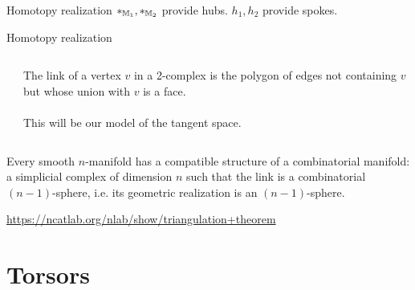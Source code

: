 \documentclass[14pt,aspectratio=169]{beamer}
\renewcommand{\defemph}[1]{\alert{#1}}
\begin{document}

\begin{frame}{Homotopy realization}
\( *_{\mathbb{M}_1}, *_{\mathbb{M}_2} \) provide \alert{hubs}. \( h_1, h_2 \) provide \alert{spokes}.
\[\]
\end{frame}


\begin{frame}{Homotopy realization}
\begin{columns}
\begin{column}{0.5\textwidth}

\end{column}
\begin{column}{0.5\textwidth}
The \defemph{link} of a vertex \( v \) in a 2-complex is the polygon of edges not containing \( v \) but whose union with \( v \) is a face.\\~\\

This will be our model of the tangent space.
\end{column}
\end{columns}
\end{frame}

\begin{frame}
\begin{theorem}[Whitehead (1940)]
Every smooth \( n \)-manifold has a compatible structure of a \alert{combinatorial manifold}: a simplicial complex of dimension \( n \) such that the link is a combinatorial \( (n-1) \)-sphere, i.e. its geometric realization is an \( (n-1) \)-sphere.
\end{theorem}
\url{https://ncatlab.org/nlab/show/triangulation+theorem}
\end{frame}

\section{Torsors}
\end{document}
